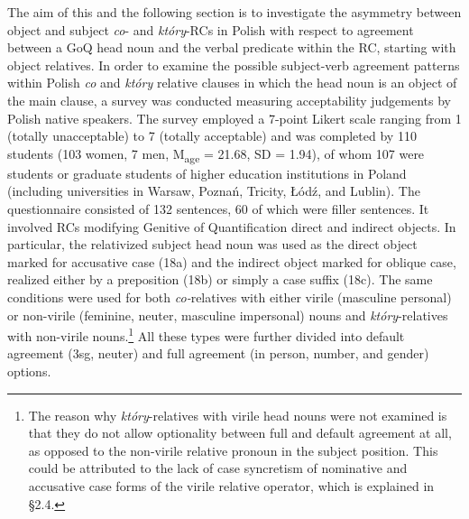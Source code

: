\documentclass[output=paper]{langsci/langscibook}
\begin{document}
The aim of this and the following section is to investigate the asymmetry between object and subject \textit{co}{}- and \textit{który}{}-RCs in Polish with respect to agreement between a GoQ head noun and the verbal predicate within the RC, starting with object relatives. In order to examine the possible subject-verb agreement patterns within Polish \textit{co} and \textit{który} relative clauses in which the head noun is an object of the main clause, a survey was conducted measuring acceptability judgements by Polish native speakers. The survey employed a 7-point Likert scale ranging from 1 (totally unacceptable) to 7 (totally acceptable) and was completed by 110 students (103 women, 7 men, M\textsubscript{age} = 21.68, SD = 1.94), of whom 107 were students or graduate students of higher education institutions in Poland (including universities in Warsaw, Poznań, Tricity, Łódź, and Lublin). The questionnaire consisted of 132 sentences, 60 of which were filler sentences. It involved RCs modifying Genitive of Quantification direct and indirect objects. In particular, the relativized subject head noun was used as the direct object marked for accusative case (18a) and the indirect object marked for oblique case, realized either by a preposition (18b) or simply a case suffix (18c). The same conditions were used for both \textit{co-}relatives with either virile (masculine personal) or non-virile (feminine, neuter, masculine impersonal) nouns and \textit{który}{}-relatives with non-virile nouns.\footnote{The reason why \textit{który}{}-relatives with virile head nouns were not examined is that they do not allow optionality between full and default agreement at all, as opposed to the non-virile relative pronoun in the subject position. This could be attributed to the lack of case syncretism of nominative and accusative case forms of the virile relative operator, which is explained in §2.4.} All these types were further divided into default agreement (3sg, neuter) and full agreement (in person, number, and gender) options.
\end{document}
